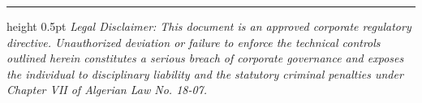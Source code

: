 \documentclass[11pt,a4paper]{article}
\begin{document}
\vspace{20pt}
\hrule height 0.5pt
\vspace{4pt}
{\footnotesize \itshape * Legal Disclaimer: This document is an approved corporate regulatory directive. Unauthorized deviation or failure to enforce the technical controls outlined herein constitutes a serious breach of corporate governance and exposes the individual to disciplinary liability and the statutory criminal penalties under Chapter VII of Algerian Law No. 18-07.}
\end{document}

